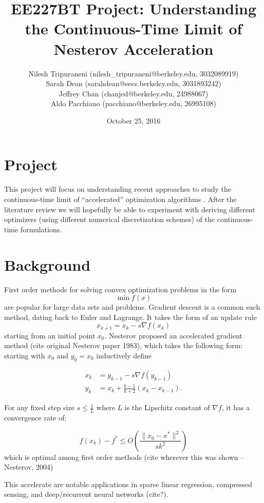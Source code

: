 \documentclass{article}
\title{EE227BT Project:
Understanding the Continuous-Time Limit of Nesterov Acceleration}
\author{Nilesh Tripuraneni (nilesh\_tripuraneni@berkeley.edu, 3032089919)\\ Sarah Dean (sarahdean@eecs.berkeley.edu, 3031893242)\\ Jeffrey Chan (chanjed@berkeley.edu, 24988067)\\ Aldo Pacchiano (pacchiano@berkeley.edu, 26995108)}
\date{October 25, 2016}
\begin{document}
\maketitle


\section{Project}

This project will focus on understanding recent approaches to study the continuous-time limit of ``accelerated'' optimization algorithms \cite{su2014differential, wibisono2016variational, krichene2015accelerated}. After
the literature review we will hopefully be able to experiment with deriving different optimizers (using different numerical discretization schemes) of the continuous-time formulations.

\section{Background}
First order methods for solving convex optimization problems in the form
\[\min f(x)\]
are popular for large data sets and problems. Gradient descent is a common such method, dating back to Euler and Lagrange. It takes the form of an update rule
\[x_{k+1} = x_k - s \nabla f(x_k)\]
starting from an initial point $x_0$. Nesterov proposed an accelerated gradient method  (cite original Nesterov paper 1983), which takes the following form: starting with $x_0$ and $y_0 = x_0$ inductively define

\begin{align*}
    x_k &= y_{k-1} - s \nabla f(y_{k-1})\\
    y_k &= x_k + \frac{k-1}{k+2} (x_k - x_{k-1}).
\end{align*}

For any fixed step size $s \leq \frac{1}{L}$ where $L$ is the Lipschitz constant of $\nabla f$, it has a convergence rate of:
 
\begin{equation}
f(x_k) - f^* \leq O \left(\frac{\|x_0 - x^*\|^2}{sk^2} \right)
\end{equation}
which is optimal among first order methods (cite wherever this was shown -- Nesterov, 2004)

This accelerate are notable applications in sparse linear regression, compressed sensing, and deep/recurrent neural networks (cite?).




\end{document}
